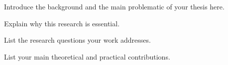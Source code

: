 
Introduce the background and the main problematic of your thesis here.

Explain why this research is essential.

List the research questions your work addresses.

List your main theoretical and practical contributions.
